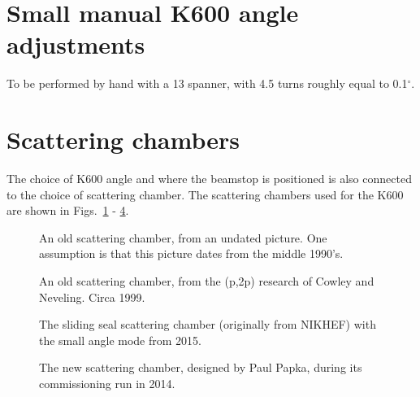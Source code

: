 \documentclass[11pt]{report}
\begin{document}
\section{Small manual K600 angle adjustments}

To be performed by hand with a 13 spanner, with 4.5 turns roughly equal to 0.1$^{\circ}$.


\section{Scattering chambers}

The choice of K600 angle and where the beamstop is positioned is also connected to the choice of scattering
chamber.  The scattering chambers used for the K600 are shown in Figs.~\ref{fig:old-scat-chamber} - \ref{fig:new-scat-chamber}.

\begin{figure}[!ht]
\centerline{\vspace{0cm}\hspace{0cm}
}
\centering
\caption{An old scattering chamber, from an undated picture. One assumption is that this picture
dates from the middle 1990's.}
\label{fig:old-scat-chamber}
\end{figure} 

\begin{figure}[!ht]
\centerline{\vspace{0cm}\hspace{0cm}
}
\centering
\caption{An old scattering chamber, from the (p,2p) research of Cowley and Neveling. Circa 1999.}
\label{fig:old-scat-chamber-2}
\end{figure} 

\begin{figure}[!ht]
\centerline{\vspace{0cm}\hspace{0cm}
}
\centering
\caption{The sliding seal scattering chamber (originally from NIKHEF) with the small angle mode from 2015.}
\label{fig:slidingseal-scat-chamber}
\end{figure} 

\begin{figure}[!ht]
\centerline{\vspace{0cm}\hspace{0cm}
}
\centering
\caption{The new scattering chamber, designed by Paul Papka, during its commissioning run in 2014.}
\label{fig:new-scat-chamber}
\end{figure} 
\end{document}
